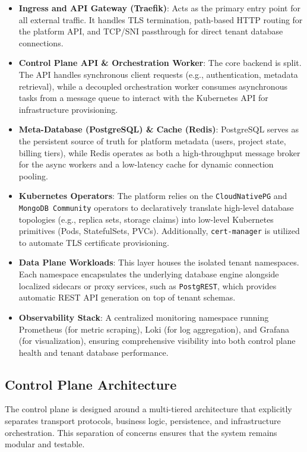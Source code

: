 \begin{itemize}
    \item \textbf{Ingress and API Gateway (Traefik)}: Acts as the primary entry point for all external traffic. It handles TLS termination, path-based HTTP routing for the platform API, and TCP/SNI passthrough for direct tenant database connections.
    \item \textbf{Control Plane API \& Orchestration Worker}: The core backend is split. The API handles synchronous client requests (e.g., authentication, metadata retrieval), while a decoupled orchestration worker consumes asynchronous tasks from a message queue to interact with the Kubernetes API for infrastructure provisioning.
    \item \textbf{Meta-Database (PostgreSQL) \& Cache (Redis)}: PostgreSQL serves as the persistent source of truth for platform metadata (users, project state, billing tiers), while Redis operates as both a high-throughput message broker for the async workers and a low-latency cache for dynamic connection pooling.
    \item \textbf{Kubernetes Operators}: The platform relies on the \texttt{CloudNativePG} and \texttt{MongoDB Community} operators to declaratively translate high-level database topologies (e.g., replica sets, storage claims) into low-level Kubernetes primitives (Pods, StatefulSets, PVCs). Additionally, \texttt{cert-manager} is utilized to automate TLS certificate provisioning.
    \item \textbf{Data Plane Workloads}: This layer houses the isolated tenant namespaces. Each namespace encapsulates the underlying database engine alongside localized sidecars or proxy services, such as \texttt{PostgREST}, which provides automatic REST API generation on top of tenant schemas.
    \item \textbf{Observability Stack}: A centralized monitoring namespace running Prometheus (for metric scraping), Loki (for log aggregation), and Grafana (for visualization), ensuring comprehensive visibility into both control plane health and tenant database performance.
\end{itemize}

\subsection{Control Plane Architecture}

The control plane is designed around a multi-tiered architecture that explicitly separates transport protocols, business logic, persistence, and infrastructure orchestration. This separation of concerns ensures that the system remains modular and testable.


